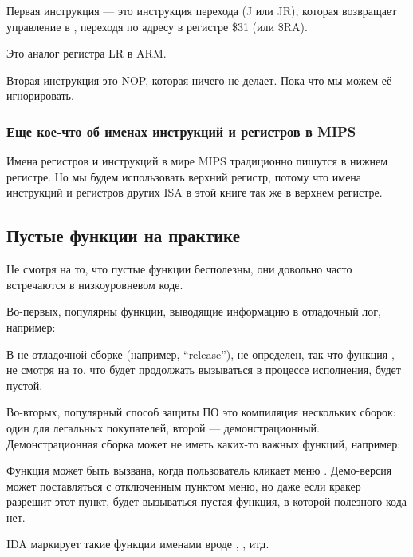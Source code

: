 
Первая инструкция --- это инструкция перехода (J или JR),
которая возвращает управление в , переходя по адресу в регистре \$31 (или \$RA).

Это аналог регистра \ac{LR} в ARM.

Вторая инструкция это \ac{NOP}, которая ничего не делает.
Пока что мы можем её игнорировать.

\subsubsection{Еще кое-что об именах инструкций и регистров в MIPS}
Имена регистров и инструкций в мире MIPS традиционно пишутся в нижнем регистре.
Но мы будем использовать верхний регистр, потому что имена инструкций и регистров других
\ac{ISA} в этой книге так же в верхнем регистре.

\subsection{Пустые функции на практике}

Не смотря на то, что пустые функции бесполезны, они довольно часто встречаются в низкоуровневом коде.

Во-первых, популярны функции, выводящие информацию в отладочный лог, например:



В не-отладочной сборке (например, ``release''),  не определен, так что функция ,
не смотря на то, что будет продолжать вызываться в процессе исполнения, будет пустой.

Во-вторых, популярный способ защиты ПО это компиляция нескольких сборок: один для легальных покупателей,
второй --- демонстрационный.
Демонстрационная сборка может не иметь каких-то важных функций, например:



Функция  может быть вызвана, когда пользователь кликает меню .
Демо-версия может поставляться с отключенным пунктом меню, но даже если кракер разрешит этот пункт,
будет вызываться пустая функция, в которой полезного кода нет.

IDA маркирует такие функции именами вроде , , итд.

